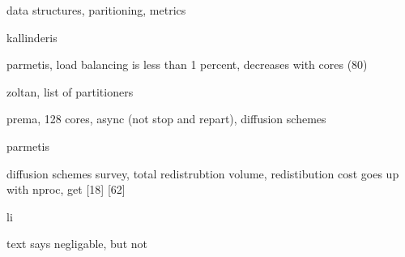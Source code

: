 \documentclass{article}
\begin{document}
data structures, paritioning, metrics
\cite{flaherty-parallel-data-structures}

kallinderis
\cite{kallinderis-load-balance,minyard-kallinderis-load-balance}

parmetis, load balancing is less than 1 percent, decreases with cores (80)
\cite{eccomas-2010-para-perf-adapt}

zoltan, list of partitioners
\cite{devine-anm-2005-zoltan-load-balancing}

prema, 128 cores, async (not stop and repart), diffusion schemes
\cite{chrisochoides-ieee-tpds-2004-load-balance}

parmetis
\cite{parmetis-sc-2000}

diffusion schemes survey, total redistrubtion volume, redistibution cost goes up with nproc,
get [18] [62]
\cite{oliker-thesis}

li
\cite{li-masters-thesis,li-load-balance}

text says negligable, but not
\cite{park-para-unsteady-adapt}



\end{document}
